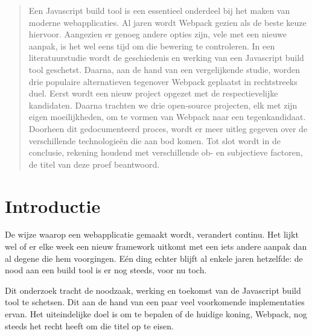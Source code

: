 \begin{multicols}{2} %


\color{HoGentAccent1} %

\begin{abstract}
    Een Javascript build tool is een essentieel onderdeel bij het maken van moderne webapplicaties. Al jaren wordt Webpack gezien als de beste keuze hiervoor. Aangezien er genoeg andere opties zijn, vele met een nieuwe aanpak, is het wel eens tijd om die bewering te controleren. In een literatuurstudie wordt de geschiedenis en werking van een Javascript build tool geschetst. Daarna, aan de hand van een vergelijkende studie, worden drie populaire alternatieven tegenover Webpack geplaatst in rechtstreeks duel. Eerst wordt een nieuw project opgezet met de respectievelijke kandidaten. Daarna trachten we drie open-source projecten, elk met zijn eigen moeilijkheden, om te vormen van Webpack naar een tegenkandidaat. Doorheen dit gedocumenteerd proces, wordt er meer uitleg gegeven over de verschillende technologieën die aan bod komen. Tot slot wordt in de conclusie, rekening houdend met verschillende ob- en subjectieve factoren, de titel van deze proef beantwoord.
\end{abstract}

\color{HoGentAccent1} 
\section*{Introductie}
\color{black}
\color{black}
De wijze waarop een webapplicatie gemaakt wordt, verandert continu. Het lijkt wel of er elke week een nieuw framework uitkomt met een iets andere aanpak dan al degene die hem voorgingen. Eén ding echter blijft al enkele jaren hetzelfde: de nood aan een build tool is er nog steeds, voor nu toch.

Dit onderzoek tracht de noodzaak, werking en toekomst van de Javascript build tool te schetsen. Dit aan de hand van een paar veel voorkomende implementaties ervan. Het uiteindelijke doel is om te bepalen of de huidige koning, Webpack, nog steeds het recht heeft om die titel op te eisen.


\end{multicols}
